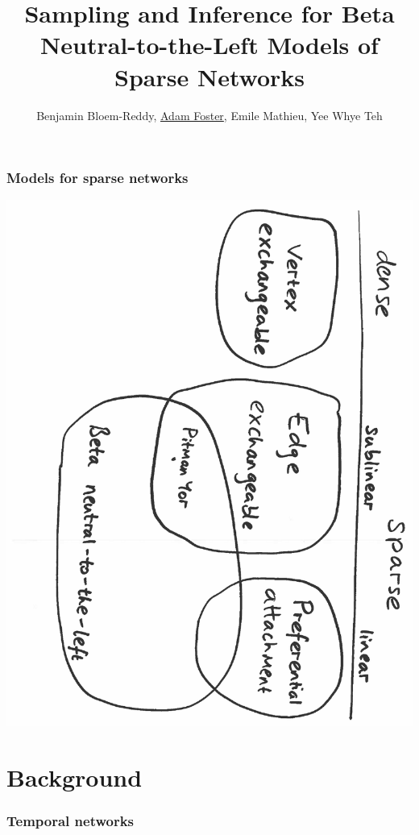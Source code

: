 \documentclass[final,hyperref={pdfpagelabels=false},noamsthm]{beamer}
\title{Sampling and Inference for Beta Neutral-to-the-Left Models of Sparse Networks} %
\author{Benjamin Bloem-Reddy, \underline{Adam Foster}, Emile Mathieu, Yee Whye Teh }
\institute{Department of Statistics, University of Oxford}
\begin{document}
	
\begin{frame}[plain]
	\titlepage
\end{frame}


\begin{frame}
	\frametitle{Models for sparse networks}
	\includegraphics[angle=90,origin=c,scale=0.4]{fig/models6}
\end{frame}

\section{Background}
\begin{frame}
	\frametitle{Temporal networks}
	\begin{center}
	\end{center}
\end{frame}
\end{document}
